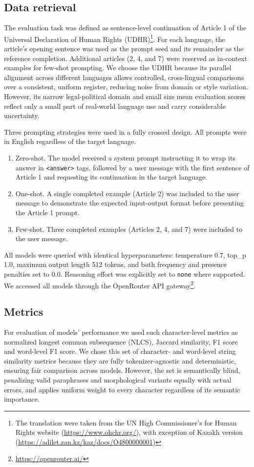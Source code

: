 \documentclass[11pt]{article}
\begin{document}
\subsection{Data retrieval}
The evaluation task was defined as sentence-level continuation of Article 1 of the Universal Declaration of Human Rights (UDHR)\footnote{The translation were taken from the UN High Commissioner's for Human Rights website (\url{https://www.ohchr.org/}), with exception of Kazakh version (\url{https://adilet.zan.kz/kaz/docs/O4800000001})}.
For each language, the article's opening sentence was used as the prompt seed and its remainder as the reference completion.
Additional articles (2, 4, and 7) were reserved as in-context examples for few-shot prompting.
We choose the UDHR because its parallel alignment across different languages allows controlled, cross-lingual comparisons over a consistent, uniform register, reducing noise from domain or style variation.
However, its narrow legal-political domain and small size mean evaluation scores reflect only a small part of real-world language use and carry considerable uncertainty.

Three prompting strategies were used in a fully crossed design. All prompts were in English regardless of the target language.

\begin{enumerate}
\item Zero-shot. The model received a system prompt instructing it to wrap its answer in \texttt{<answer>} tags, followed by a user message with the first sentence of Article 1 and requesting its continuation in the target language.
\item One-shot. A single completed example (Article 2) was included to the user message to demonstrate the expected input-output format before presenting the Article 1 prompt.
\item Few-shot. Three completed examples (Articles 2, 4, and 7) were included to the user message.
\end{enumerate}

All models were queried with identical hyperparameters: temperature 0.7, top\_p 1.0, maximum output length 512 tokens, and both frequency and presence penalties set to 0.0. Reasoning effort was explicitly set to \texttt{none} where supported. We accessed all models through the OpenRouter API gateway\footnote{\url{https://openrouter.ai/}}.

\subsection{Metrics}
For evaluation of models' performance we used such character-level metrics as normalized longest common subsequence (NLCS), Jaccard similarity, F1 score and word-level F1 score. We chose this set of character- and word-level string similarity metrics because they are fully tokenizer-agnostic and deterministic, ensuring fair comparison across models. However, the set is semantically blind, penalizing valid paraphrases and morphological variants equally with actual errors, and applies uniform weight to every character regardless of its semantic importance.
\end{document}
